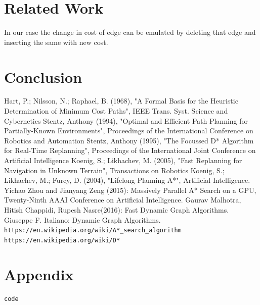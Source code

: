 \documentclass[a4paper]{article}
\begin{document}
\section{Related Work}
In our case the change in cost of edge can be emulated by deleting that edge and inserting the same with new cost.

\section{Conclusion}




\begin{thebibliography}{} 
     Hart, P.; Nilsson, N.; Raphael, B. (1968), "A Formal Basis for the Heuristic Determination of Minimum Cost Paths", IEEE Trans. Syst. Science and Cybernetics
    Stentz, Anthony (1994), "Optimal and Efficient Path Planning for Partially-Known Environments", Proceedings of the International Conference on Robotics and Automation
    Stentz, Anthony (1995), "The Focussed D* Algorithm for Real-Time Replanning", Proceedings of the International Joint Conference on Artificial Intelligence
    Koenig, S.; Likhachev, M. (2005), "Fast Replanning for Navigation in Unknown Terrain", Transactions on Robotics
    Koenig, S.; Likhachev, M.; Furcy, D. (2004), "Lifelong Planning A*", Artificial Intelligence.
    Yichao Zhou and Jianyang Zeng (2015): Massively Parallel A* Search on a GPU, Twenty-Ninth AAAI Conference on Artificial Intelligence.
    Gaurav Malhotra, Hitish Chappidi, Rupesh Nasre(2016): Fast Dynamic Graph Algorithms.
    Giuseppe F. Italiano: Dynamic Graph Algorithms.
    \texttt{https://en.wikipedia.org/wiki/A*\_search\_algorithm}
    \texttt{https://en.wikipedia.org/wiki/D*}
        

\end{thebibliography}


\newpage 
    \section{Appendix} 


\begin{lstlisting}
code
\end{lstlisting}
\end{document}
